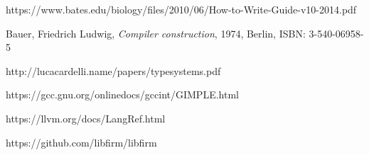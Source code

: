 \documentclass[leqno, 12pt]{article}
\begin{document}
		\newpage

	\begin{thebibliography}{9}
			https://www.bates.edu/biology/files/2010/06/How-to-Write-Guide-v10-2014.pdf
		
			Bauer, Friedrich Ludwig,
			\emph{Compiler construction},
			1974, Berlin,
			ISBN: 3-540-06958-5
		
			http://lucacardelli.name/papers/typesystems.pdf
	
			https://gcc.gnu.org/onlinedocs/gccint/GIMPLE.html

			https://llvm.org/docs/LangRef.html

			https://github.com/libfirm/libfirm
	\end{thebibliography}
\end{document}
